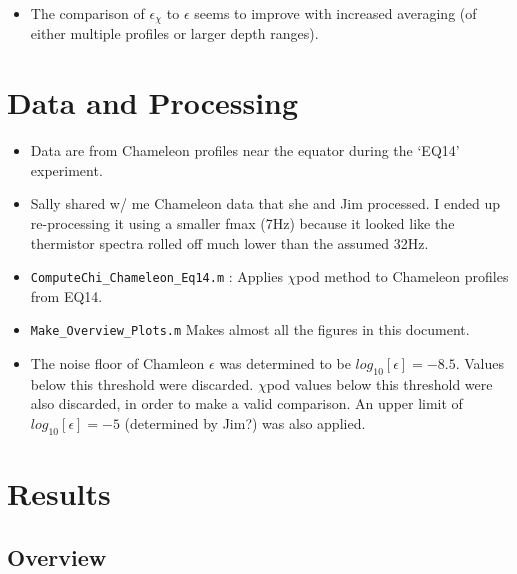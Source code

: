 \documentclass[11pt]{article}
\begin{document}
\begin{itemize}
\item The comparison of $\epsilon_{\chi}$ to $\epsilon$ seems to improve with increased averaging (of either multiple profiles or larger depth ranges). 

\end{itemize}




\clearpage
\section{Data and Processing}

\begin{itemize}

\item Data are from Chameleon profiles near the equator during the `EQ14' experiment.

\item Sally shared w/ me Chameleon data that she and Jim processed. I ended up re-processing it using a smaller fmax (7Hz) because it looked like the thermistor spectra rolled off much lower than the assumed 32Hz.

\item \verb+ComputeChi_Chameleon_Eq14.m+ : Applies $\chi$pod method to Chameleon profiles from EQ14.

\item \verb+Make_Overview_Plots.m+ Makes almost all the figures in this document.

\item The noise floor of Chamleon $\epsilon$ was determined to be $log_{10}[\epsilon]=-8.5$. Values below this threshold were discarded. $\chi$pod values below this threshold were also discarded, in order to make a valid comparison. An upper limit of $log_{10}[\epsilon]=-5$ (determined by Jim?) was also applied.

\end{itemize}




\clearpage
\section{Results}


\subsection{Overview}
\end{document}
